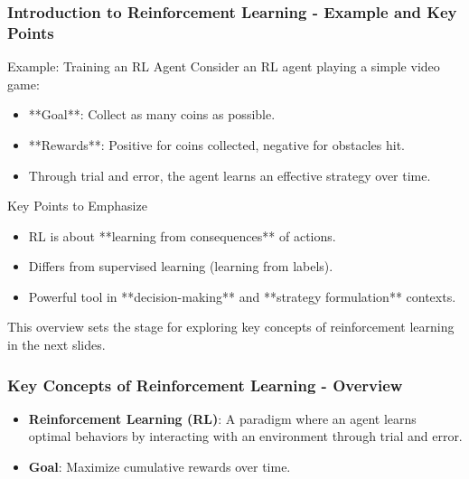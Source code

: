\documentclass[aspectratio=169]{beamer}
\begin{document}
\begin{frame}[fragile]
    \frametitle{Introduction to Reinforcement Learning - Example and Key Points}
    \begin{block}{Example: Training an RL Agent}
        Consider an RL agent playing a simple video game:
        \begin{itemize}
            \item **Goal**: Collect as many coins as possible.
            \item **Rewards**: Positive for coins collected, negative for obstacles hit.
            \item Through trial and error, the agent learns an effective strategy over time.
        \end{itemize}
    \end{block}
    
    \begin{block}{Key Points to Emphasize}
        \begin{itemize}
            \item RL is about **learning from consequences** of actions.
            \item Differs from supervised learning (learning from labels).
            \item Powerful tool in **decision-making** and **strategy formulation** contexts.
        \end{itemize}
    \end{block}
    This overview sets the stage for exploring key concepts of reinforcement learning in the next slides.
\end{frame}

\begin{frame}[fragile]
    \frametitle{Key Concepts of Reinforcement Learning - Overview}
    \begin{itemize}
        \item \textbf{Reinforcement Learning (RL)}: A paradigm where an agent learns optimal behaviors by interacting with an environment through trial and error.
        \item \textbf{Goal}: Maximize cumulative rewards over time.
    \end{itemize}
\end{frame}
\end{document}
